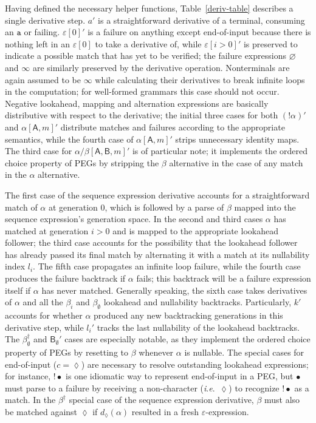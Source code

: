 \documentclass[submission,copyright,creativecommons]{eptcs}
\newcommand{\chs}[1]{\mathtt{#1}}
\newcommand{\eos}{\lozenge}
\newcommand{\g}[1]{\mathsf{#1}}
\newcommand{\anyc}{\bullet}
\newcommand{\ie}{\textit{i}.\textit{e}.}
\begin{document}
Having defined the necessary helper functions, Table~\ref{deriv-table} describes a single derivative step.
$a'$ is a straightforward derivative of a terminal, consuming an $\chs{a}$ or failing. 
$\varepsilon[0]'$ is a failure on anything except end-of-input because there is nothing left in an $\varepsilon[0]$ to take a derivative of, while $\varepsilon[i > 0]'$ is preserved to indicate a possible match that has yet to be verified; the failure expressions $\varnothing$ and $\infty$ are similarly preserved by the derivative operation. 
Nonterminals are again assumed to be $\infty$ while calculating their derivatives to break infinite loops in the computation; for well-formed grammars this case should not occur. 
Negative lookahead, mapping and alternation expressions are basically distributive with respect to the derivative; the initial three cases for both $(!\alpha)'$ and $\alpha[\g{A},m]'$ distribute matches and failures according to the appropriate semantics, while the fourth case of $\alpha[\g{A},m]'$ strips unnecessary identity maps. 
The third case for $\alpha/\beta[\g{A},\g{B},m]'$ is of particular note; it implements the ordered choice property of PEGs by stripping the $\beta$ alternative in the case of any match in the $\alpha$ alternative.

The first case of the sequence expression derivative accounts for a straightforward match of $\alpha$ at generation 0, which is followed by a parse of $\beta$ mapped into the sequence expression's generation space. 
In the second and third cases $\alpha$ has matched at generation $i > 0$ and is mapped to the appropriate lookahead follower; the third case accounts for the possibility that the lookahead follower has already passed its final match by alternating it with a match at its nullability index $l_i$. 
The fifth case propagates an infinite loop failure, while the fourth case produces the failure backtrack if $\alpha$ fails; this backtrack will be a failure expression itself if $\alpha$ has never matched. 
Generally speaking, the sixth case takes derivatives of $\alpha$ and all the $\beta_i$ and $\beta_\emptyset$ lookahead and nullability backtracks. 
Particularly, $k'$ accounts for whether $\alpha$ produced any new backtracking generations in this derivative step, while $l_i'$ tracks the last nullability of the lookahead backtracks. 
The $\beta_\emptyset^\dagger$ and $\g{B}_\emptyset'$ cases are especially notable, as they implement the ordered choice property of PEGs by resetting to $\beta$ whenever $\alpha$ is nullable. 
The special cases for end-of-input ($c = \eos$) are necessary to resolve outstanding lookahead expressions; for instance, $!\anyc$ is one idiomatic way to represent end-of-input in a PEG, but $\anyc$ must parse to a failure by receiving a non-character (\ie\ $\eos$) to recognize $!\anyc$ as a match. 
In the $\beta^\dagger$ special case of the sequence expression derivative, $\beta$ must also be matched against $\eos$ if $d_\eos(\alpha)$ resulted in a fresh $\varepsilon$-expression.
\end{document}
